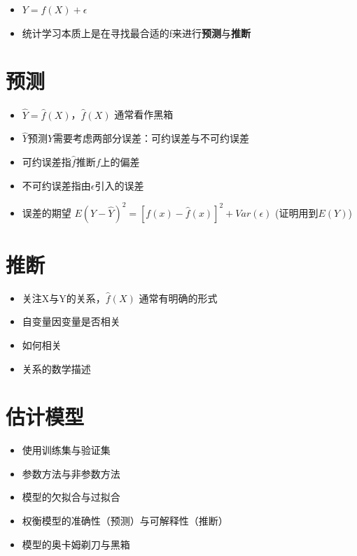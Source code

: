 \documentclass[]{book}
\providecommand{\tightlist}{%
  \setlength{\itemsep}{0pt}\setlength{\parskip}{0pt}}
\begin{document}
\begin{itemize}
\tightlist
\item
  \(Y = f(X) + \epsilon\)
\item
  统计学习本质上是在寻找最合适的f来进行\textbf{预测}与\textbf{推断}
\end{itemize}

\hypertarget{ux9884ux6d4b}{%
\section{预测}\label{ux9884ux6d4b}}

\begin{itemize}
\tightlist
\item
  \(\hat Y = \hat f(X)\)，\(\hat f(X)\) 通常看作黑箱
\item
  \(\hat Y\)预测\(Y\)需要考虑两部分误差：可约误差与不可约误差
\item
  可约误差指\(\hat f\)推断\(f\)上的偏差
\item
  不可约误差指由\(\epsilon\)引入的误差
\item
  误差的期望 \(E(Y - \hat Y)^2 = [f(x) - \hat f(x)]^2 + Var(\epsilon)\) (证明用到\(E(Y)\))
\end{itemize}

\hypertarget{ux63a8ux65ad}{%
\section{推断}\label{ux63a8ux65ad}}

\begin{itemize}
\tightlist
\item
  关注X与Y的关系，\(\hat f(X)\) 通常有明确的形式
\item
  自变量因变量是否相关
\item
  如何相关
\item
  关系的数学描述
\end{itemize}

\hypertarget{ux4f30ux8ba1ux6a21ux578b}{%
\section{估计模型}\label{ux4f30ux8ba1ux6a21ux578b}}

\begin{itemize}
\tightlist
\item
  使用训练集与验证集
\item
  参数方法与非参数方法
\item
  模型的欠拟合与过拟合
\item
  权衡模型的准确性（预测）与可解释性（推断）
\item
  模型的奥卡姆剃刀与黑箱
\end{itemize}
\end{document}
